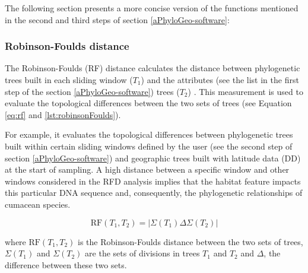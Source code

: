 The following section presents a more concise version of the functions mentioned in the second and third steps of section \autoref{aPhyloGeo-software}:

\subsubsection{Robinson-Foulds distance}\label{RF}
The Robinson-Foulds (RF) distance calculates the distance between phylogenetic trees built in each sliding window ($T_1$) and the attributes (see the list in the first step of the section \autoref{aPhyloGeo-software}) trees ($T_2$) \citep{koshkarov_phylogeography_2022}. This measurement is used to evaluate the topological differences between the two sets of trees (see Equation \eqref{eq:rf} and \autoref{lst:robinsonFoulds}).

For example, it evaluates the topological differences between phylogenetic trees built within certain sliding windows defined by the user (see the second step of section \autoref{aPhyloGeo-software}) and geographic trees built with latitude data (DD) at the start of sampling. A high distance between a specific window and other windows considered in the RFD analysis implies that the habitat feature impacts this particular DNA sequence and, consequently, the phylogenetic relationships of cumacean species.

\begin{equation}\label{eq:rf}
    \text{RF}(T_1, T_2) = | \Sigma(T_1) \Delta \Sigma(T_2) |
\end{equation}

where $\text{RF}(T_1, T_2)$ is the Robinson-Foulds distance between the two sets of trees, $\Sigma(T_1)$ and $\Sigma(T_2)$ are the sets of divisions in trees $T_1$ and $T_2$ and $ \Delta $, the difference between these two sets.

